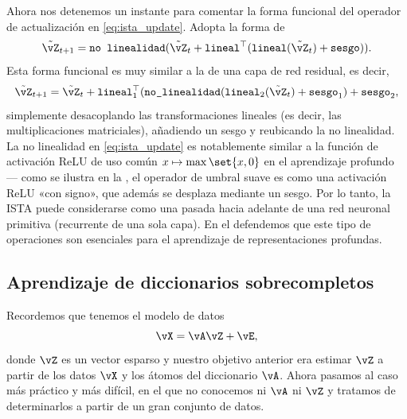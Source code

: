 \documentclass[../../book-main.tex]{subfiles}
\begin{document}
Ahora nos detenemos un instante para comentar la forma funcional del operador de actualización
en \eqref{eq:ista_update}. Adopta la forma de
\begin{equation}
\tilde{\vZ}_{t + 1} = \texttt{no linealidad}(\tilde{\vZ}_{t} +
    \texttt{lineal}^{\top}(\texttt{lineal}(\tilde{\vZ}_{t}) + \texttt{sesgo})).
\end{equation}
Esta forma funcional es muy similar a la de una capa de red residual,
es decir,
\begin{equation}
    \tilde{\vZ}_{t + 1} = \tilde{\vZ}_{t} +
    \texttt{lineal}_{1}^{\top}(\texttt{no\_linealidad}(\texttt{lineal}_{2}(\tilde{\vZ}_{t})
        + \texttt{sesgo}_{1}) + \texttt{sesgo}_{2},
    \end{equation}
simplemente desacoplando las transformaciones lineales (es decir, las multiplicaciones matriciales),
añadiendo un sesgo y reubicando la no linealidad.
La no linealidad en \eqref{eq:ista_update} es notablemente similar a la
función de activación ReLU de uso común $x \mapsto \max\set{x, 0}$ en el aprendizaje profundo
--- como se ilustra en la , el operador de umbral suave es como una 
activación ReLU «con signo», que además se desplaza mediante un sesgo.
Por lo tanto, la ISTA puede considerarse como una pasada hacia adelante de una red neuronal primitiva 
(recurrente de una sola capa). En el  defendemos que este tipo de operaciones 
son esenciales para el aprendizaje de representaciones profundas.

\subsection{Aprendizaje de diccionarios sobrecompletos}

Recordemos que tenemos el modelo de datos
\begin{equation}\label{eq:overcomplete-dl-section-data-model}
    \vX = \vA\vZ + \vE,
\end{equation}
donde \(\vZ\) es un vector esparso y nuestro objetivo anterior era estimar
\(\vZ\) a partir de los datos \(\vX\) y los átomos del 
diccionario \(\vA\).
Ahora pasamos al caso más práctico y más difícil, en el que no conocemos
ni \(\vA\) ni \(\vZ\) y tratamos de determinarlos a partir de un gran conjunto de datos.
\end{document}
